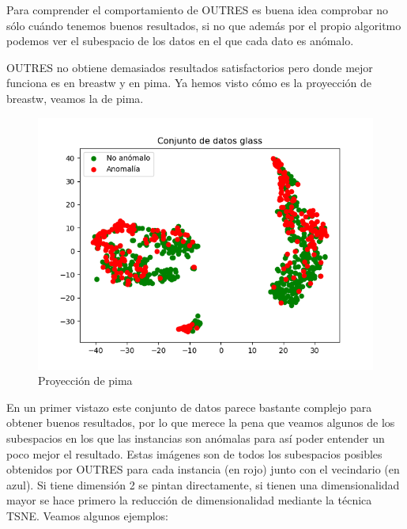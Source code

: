 Para comprender el comportamiento de OUTRES es buena idea comprobar no sólo cuándo tenemos buenos resultados, si no que además por el propio algoritmo podemos ver el subespacio de los datos en el que cada dato es anómalo.

OUTRES no obtiene demasiados resultados satisfactorios pero donde mejor funciona es en breastw y en pima. Ya hemos visto cómo es la proyección de breastw, veamos la de pima.

\begin{figure}[H]
	\centering
	\label{pima}
	\includegraphics[scale=0.7]{imagenes/pima}
	\caption{Proyección de pima}
\end{figure}

En un primer vistazo este conjunto de datos parece bastante complejo para obtener buenos resultados, por lo que merece la pena que veamos algunos de los subespacios en los que las instancias son anómalas para así poder entender un poco mejor el resultado. Estas imágenes son de todos los subespacios posibles obtenidos por OUTRES para cada instancia (en rojo) junto con el vecindario (en azul). Si tiene dimensión 2 se pintan directamente, si tienen una dimensionalidad mayor se hace primero la reducción de dimensionalidad mediante la técnica TSNE. Veamos algunos ejemplos:

